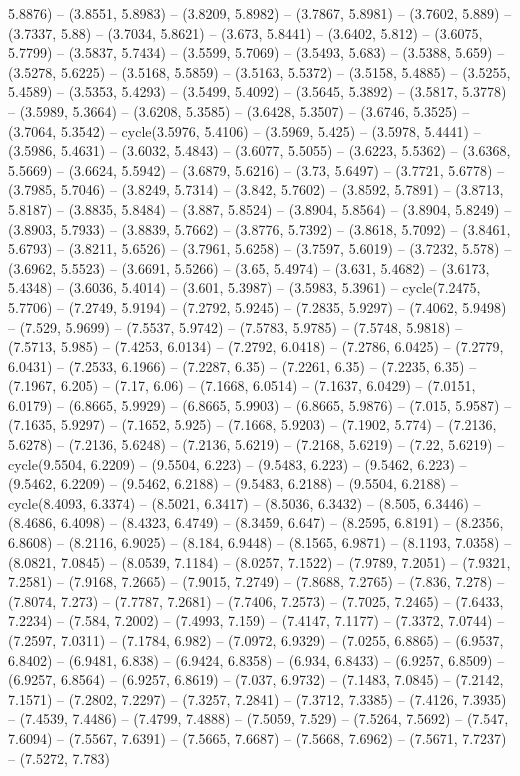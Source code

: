 5.8876) -- (3.8551, 5.8983) -- (3.8209, 5.8982) -- (3.7867, 5.8981) -- (3.7602, 5.889) -- (3.7337, 5.88) -- (3.7034, 5.8621) -- (3.673, 5.8441) -- (3.6402, 5.812) -- (3.6075, 5.7799) -- (3.5837, 5.7434) -- (3.5599, 5.7069) -- (3.5493, 5.683) -- (3.5388, 5.659) -- (3.5278, 5.6225) -- (3.5168, 5.5859) -- (3.5163, 5.5372) -- (3.5158, 5.4885) -- (3.5255, 5.4589) -- (3.5353, 5.4293) -- (3.5499, 5.4092) -- (3.5645, 5.3892) -- (3.5817, 5.3778) -- (3.5989, 5.3664) -- (3.6208, 5.3585) -- (3.6428, 5.3507) -- (3.6746, 5.3525) -- (3.7064, 5.3542) -- cycle(3.5976, 5.4106) -- (3.5969, 5.425) -- (3.5978, 5.4441) -- (3.5986, 5.4631) -- (3.6032, 5.4843) -- (3.6077, 5.5055) -- (3.6223, 5.5362) -- (3.6368, 5.5669) -- (3.6624, 5.5942) -- (3.6879, 5.6216) -- (3.73, 5.6497) -- (3.7721, 5.6778) -- (3.7985, 5.7046) -- (3.8249, 5.7314) -- (3.842, 5.7602) -- (3.8592, 5.7891) -- (3.8713, 5.8187) -- (3.8835, 5.8484) -- (3.887, 5.8524) -- (3.8904, 5.8564) -- (3.8904, 5.8249) -- (3.8903, 5.7933) -- (3.8839, 5.7662) -- (3.8776, 5.7392) -- (3.8618, 5.7092) -- (3.8461, 5.6793) -- (3.8211, 5.6526) -- (3.7961, 5.6258) -- (3.7597, 5.6019) -- (3.7232, 5.578) -- (3.6962, 5.5523) -- (3.6691, 5.5266) -- (3.65, 5.4974) -- (3.631, 5.4682) -- (3.6173, 5.4348) -- (3.6036, 5.4014) -- (3.601, 5.3987) -- (3.5983, 5.3961) -- cycle(7.2475, 5.7706) -- (7.2749, 5.9194) -- (7.2792, 5.9245) -- (7.2835, 5.9297) -- (7.4062, 5.9498) -- (7.529, 5.9699) -- (7.5537, 5.9742) -- (7.5783, 5.9785) -- (7.5748, 5.9818) -- (7.5713, 5.985) -- (7.4253, 6.0134) -- (7.2792, 6.0418) -- (7.2786, 6.0425) -- (7.2779, 6.0431) -- (7.2533, 6.1966) -- (7.2287, 6.35) -- (7.2261, 6.35) -- (7.2235, 6.35) -- (7.1967, 6.205) -- (7.17, 6.06) -- (7.1668, 6.0514) -- (7.1637, 6.0429) -- (7.0151, 6.0179) -- (6.8665, 5.9929) -- (6.8665, 5.9903) -- (6.8665, 5.9876) -- (7.015, 5.9587) -- (7.1635, 5.9297) -- (7.1652, 5.925) -- (7.1668, 5.9203) -- (7.1902, 5.774) -- (7.2136, 5.6278) -- (7.2136, 5.6248) -- (7.2136, 5.6219) -- (7.2168, 5.6219) -- (7.22, 5.6219) -- cycle(9.5504, 6.2209) -- (9.5504, 6.223) -- (9.5483, 6.223) -- (9.5462, 6.223) -- (9.5462, 6.2209) -- (9.5462, 6.2188) -- (9.5483, 6.2188) -- (9.5504, 6.2188) -- cycle(8.4093, 6.3374) -- (8.5021, 6.3417) -- (8.5036, 6.3432) -- (8.505, 6.3446) -- (8.4686, 6.4098) -- (8.4323, 6.4749) -- (8.3459, 6.647) -- (8.2595, 6.8191) -- (8.2356, 6.8608) -- (8.2116, 6.9025) -- (8.184, 6.9448) -- (8.1565, 6.9871) -- (8.1193, 7.0358) -- (8.0821, 7.0845) -- (8.0539, 7.1184) -- (8.0257, 7.1522) -- (7.9789, 7.2051) -- (7.9321, 7.2581) -- (7.9168, 7.2665) -- (7.9015, 7.2749) -- (7.8688, 7.2765) -- (7.836, 7.278) -- (7.8074, 7.273) -- (7.7787, 7.2681) -- (7.7406, 7.2573) -- (7.7025, 7.2465) -- (7.6433, 7.2234) -- (7.584, 7.2002) -- (7.4993, 7.159) -- (7.4147, 7.1177) -- (7.3372, 7.0744) -- (7.2597, 7.0311) -- (7.1784, 6.982) -- (7.0972, 6.9329) -- (7.0255, 6.8865) -- (6.9537, 6.8402) -- (6.9481, 6.838) -- (6.9424, 6.8358) -- (6.934, 6.8433) -- (6.9257, 6.8509) -- (6.9257, 6.8564) -- (6.9257, 6.8619) -- (7.037, 6.9732) -- (7.1483, 7.0845) -- (7.2142, 7.1571) -- (7.2802, 7.2297) -- (7.3257, 7.2841) -- (7.3712, 7.3385) -- (7.4126, 7.3935) -- (7.4539, 7.4486) -- (7.4799, 7.4888) -- (7.5059, 7.529) -- (7.5264, 7.5692) -- (7.547, 7.6094) -- (7.5567, 7.6391) -- (7.5665, 7.6687) -- (7.5668, 7.6962) -- (7.5671, 7.7237) -- (7.5272, 7.783) 